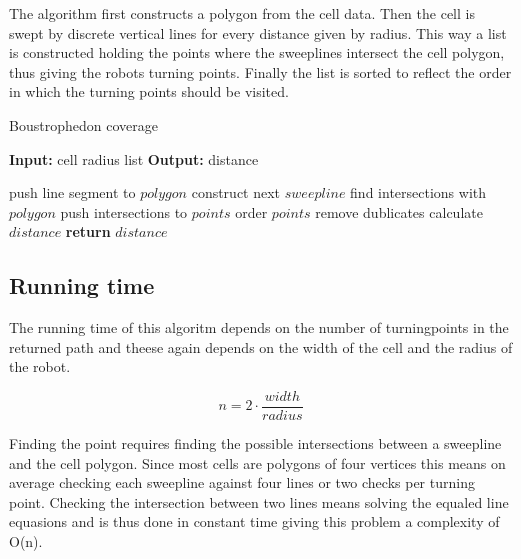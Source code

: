 The algorithm first constructs a polygon from the cell data. Then the cell is
swept by discrete vertical lines for every distance given by radius. This way a
list is constructed holding the points where the sweeplines intersect the cell
polygon, thus giving the robots turning points. Finally the list is sorted to
reflect the order in which the turning points should be visited.

\begin{algorithm}
\caption{Boustrophedon coverage}\label{fig:boustrophedon}
\begin{algorithmic}[0]
\State \textbf{Input:}
\State cell
\State radius
\State list
\State \textbf{Output:}
\State distance
\end{algorithmic}
\begin{algorithmic}[1]
\State push line segment to $polygon$
\EndFor
{}
\State construct next $sweepline$
\State find intersections with $polygon$
\State push intersections to $points$
\EndWhile
{}
\State order $points$
\EndFor
{}
\State remove dublicates
\EndFor
{}
\State calculate $distance$
\EndFor
\State \textbf{return} $distance$
\EndFunction
\end{algorithmic}
\end{algorithm}

\subsection{ Running time }
The running time of this algoritm depends on the number of turningpoints in the
returned path and theese again depends on the width of the cell and the radius
of the robot.

\begin{equation}
n = 2 \cdot \frac{width}{radius}
\end{equation}

Finding the point requires finding the possible intersections between a
sweepline and the cell polygon. Since most cells are polygons of four vertices
this means on average checking each sweepline against four lines or two checks
per turning point. Checking the intersection between two lines means solving the
equaled line equasions and is thus done in constant time giving this problem a
complexity of O(n).

